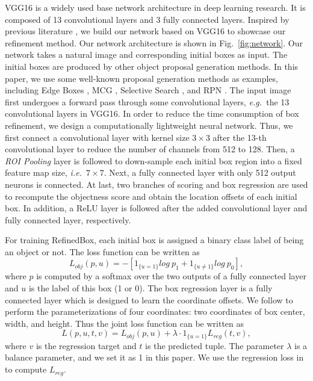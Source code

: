 \documentclass[10pt,twocolumn,letterpaper]{article}
\newcommand{\figref}[1]{Fig.~\ref{#1}}
\def\ie{\emph{i.e.~}}
\def\eg{\emph{e.g.~}}
\begin{document}
VGG16 \cite{simonyan2014very} is a widely used base network architecture
in deep learning research.
It is composed of 13 convolutional layers and 3 fully connected layers.
Inspired by previous literature \cite{girshick2015fast,ren2015faster},
we build our network based on VGG16 to showcase our refinement method.
Our network architecture is shown in \figref{fig:network}.
Our network takes a natural image and corresponding initial boxes as input.
%
The initial boxes are produced by other object proposal generation methods.
In this paper, we use some well-known proposal generation methods as examples, 
including Edge Boxes \cite{zitnick2014edge}, 
MCG \cite{arbelaez2014multiscale},
Selective Search \cite{uijlings2013selective},
and RPN \cite{ren2015faster}.
%
The input image first undergoes a forward pass through some convolutional layers,
\eg the 13 convolutional layers in VGG16.
In order to reduce the time consumption of box refinement,
we design a computationally lightweight neural network.
Thus, we first connect a convolutional layer with kernel size $3 \times 3$ after
the 13-th convolutional layer to reduce the number of channels from 512 to 128.
Then, a \textit{ROI Pooling} layer is followed to down-sample each initial box region
into a fixed feature map size, \ie $7 \times 7$.
Next, a fully connected layer with only 512 output neurons is connected.
At last, two branches of scoring and box regression are used to recompute the
objectness score and obtain the location offsets of each initial box.
In addition, a ReLU layer is followed after the added convolutional layer 
and fully connected layer, respectively.


For training RefinedBox, each initial box is assigned a binary class label of being
an object or not.
The loss function can be written as
\begin{equation}
L_{obj}(p,u) = -[1_{\{u=1\}}log~p_1 + 1_{\{u \neq 1\}}log~p_0],
\end{equation}
where $p$ is computed by a softmax over the two outputs of a fully connected layer
and $u$ is the label of this box (1 or 0).
The box regression layer is a fully connected layer which is designed to learn
the coordinate offsets.
We follow \cite{girshick2014rich} to perform the parameterizations of four coordinates:
two coordinates of box center, width, and height.
Thus the joint loss function can be written as
\begin{equation}
L(p,u,t,v) = L_{obj}(p,u) + \lambda \cdot 1_{\{u=1\}} L_{reg}(t,v),
\end{equation}
where $v$ is the regression target and $t$ is the predicted tuple.
The parameter $\lambda$ is a balance parameter, and we set it as 1 in this paper.
We use the regression loss in \cite{girshick2015fast} to compute $L_{reg}$.
\end{document}
